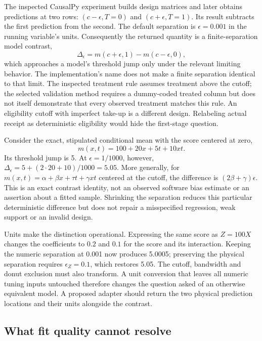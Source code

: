 The inspected CausalPy experiment builds design matrices and later obtains
predictions at two rows: $(c-\epsilon,T=0)$ and $(c+\epsilon,T=1)$. Its result
subtracts the first prediction from the second. The default separation is
$\epsilon=0.001$ in the running variable's units. Consequently the returned
quantity is a finite-separation model contrast,
\[
 \Delta_\epsilon=m(c+\epsilon,1)-m(c-\epsilon,0),
\]
which approaches a model's threshold jump only under the relevant limiting
behavior. The implementation's name does not make a finite separation identical
to that limit. The inspected treatment rule assumes treatment above the cutoff;
the selected validation method requires a dummy-coded treated column but does
not itself demonstrate that every observed treatment matches this rule.
An eligibility cutoff with imperfect take-up is a different design. Relabeling
actual receipt as deterministic eligibility would hide the first-stage question.
\citep{exec14_causalpy_primary}

Consider the exact, stipulated conditional mean with the score centered at zero,
\[
 m(x,t)=100+20x+5t+10xt.
\]
Its threshold jump is 5. At $\epsilon=1/1000$, however,
$\Delta_\epsilon=5+(2\cdot20+10)/1000=5.05$.
More generally, for $m(x,t)=\alpha+\beta x+\tau t+\gamma xt$ centered at the cutoff,
the difference is $(2\beta+\gamma)\epsilon$. This is an exact contrast identity,
not an observed software bias estimate or an assertion about a fitted sample.
Shrinking the separation reduces this particular deterministic difference but
does not repair a misspecified regression, weak support or an invalid design.
\citep{exec14_causalpy_exact}

Units make the distinction operational. Expressing the same score as $Z=100X$
changes the coefficients to $0.2$ and $0.1$ for the score and its interaction.
Keeping the numeric separation at 0.001 now produces 5.0005; preserving the
physical separation requires $\epsilon_Z=0.1$, which restores 5.05. The cutoff,
bandwidth and donut exclusion must also transform. A unit conversion that leaves
all numeric tuning inputs untouched therefore changes the question asked of an
otherwise equivalent model. A proposed adapter should return the two physical
prediction locations and their units alongside the contrast.
\citep{exec14_causalpy_exact,exec14_causalpy_decision}

\subsection{What fit quality cannot resolve}

